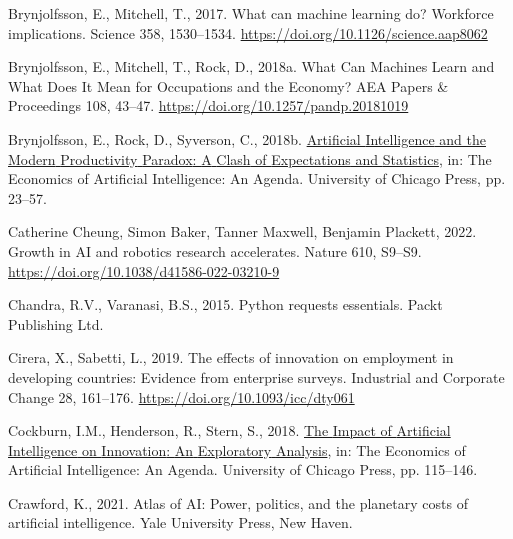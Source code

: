 \documentclass[
  12pt,
  a4paperpaper,
]{article}
\newlength{\cslhangindent}
\newenvironment{CSLReferences}[2] %
 {\begin{list}{}{%
  \setlength{\itemindent}{0pt}
  \setlength{\leftmargin}{0pt}
  \setlength{\parsep}{0pt}
  \ifodd #1
   \setlength{\leftmargin}{\cslhangindent}
   \setlength{\itemindent}{-1\cslhangindent}
  \fi
  \setlength{\itemsep}{#2\baselineskip}}}
 {\end{list}}
\begin{document}
\begin{CSLReferences}{1}{0}
Brynjolfsson, E., Mitchell, T., 2017. What can machine learning do?
{Workforce} implications. Science 358, 1530--1534.
\url{https://doi.org/10.1126/science.aap8062}

Brynjolfsson, E., Mitchell, T., Rock, D., 2018a. What {Can} {Machines}
{Learn} and {What} {Does} {It} {Mean} for {Occupations} and the
{Economy}? AEA Papers \& Proceedings 108, 43--47.
\url{https://doi.org/10.1257/pandp.20181019}

Brynjolfsson, E., Rock, D., Syverson, C., 2018b.
\href{https://www.nber.org/books-and-chapters/economics-artificial-intelligence-agenda/artificial-intelligence-and-modern-productivity-paradox-clash-expectations-and-statistics}{Artificial
{Intelligence} and the {Modern} {Productivity} {Paradox}: {A} {Clash} of
{Expectations} and {Statistics}}, in: The {Economics} of {Artificial}
{Intelligence}: {An} {Agenda}. University of Chicago Press, pp. 23--57.

Catherine Cheung, Simon Baker, Tanner Maxwell, Benjamin Plackett, 2022.
Growth in {AI} and robotics research accelerates. Nature 610, S9--S9.
\url{https://doi.org/10.1038/d41586-022-03210-9}

Chandra, R.V., Varanasi, B.S., 2015. Python requests essentials. Packt
Publishing Ltd.

Cirera, X., Sabetti, L., 2019. The effects of innovation on employment
in developing countries: Evidence from enterprise surveys. Industrial
and Corporate Change 28, 161--176.
\url{https://doi.org/10.1093/icc/dty061}

Cockburn, I.M., Henderson, R., Stern, S., 2018.
\href{https://www.nber.org/books-and-chapters/economics-artificial-intelligence-agenda/impact-artificial-intelligence-innovation-exploratory-analysis}{The
{Impact} of {Artificial} {Intelligence} on {Innovation}: {An}
{Exploratory} {Analysis}}, in: The {Economics} of {Artificial}
{Intelligence}: {An} {Agenda}. University of Chicago Press, pp.
115--146.

Crawford, K., 2021. Atlas of {AI}: Power, politics, and the planetary
costs of artificial intelligence. Yale University Press, New Haven.


\end{CSLReferences}
\end{document}
